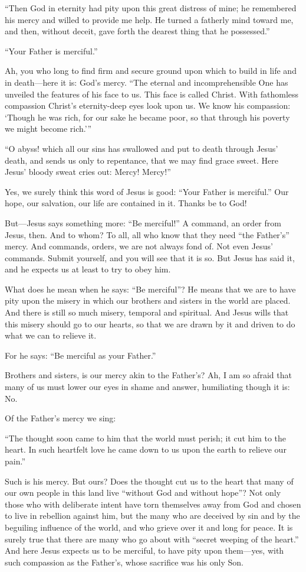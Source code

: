 “Then God in eternity had pity
upon this great distress of mine;
he remembered his mercy
and willed to provide me help.
He turned a fatherly mind toward me,
and then, without deceit, gave forth
the dearest thing that he possessed.”

“Your Father is merciful.”

Ah, you who long to find firm and secure ground upon which to build in life and in death—here it is: God’s mercy. “The eternal and incomprehensible One has unveiled the features of his face to us. This face is called Christ. With fathomless compassion Christ’s eternity-deep eyes look upon us. We know his compassion: ‘Though he was rich, for our sake he became poor, so that through his poverty we might become rich.’”

“O abyss! which all our sins
has swallowed and put to death through Jesus’ death,
and sends us only to repentance,
that we may find grace sweet.
Here Jesus’ bloody sweat cries out:
Mercy! Mercy!”

Yes, we surely think this word of Jesus is good: “Your Father is merciful.” Our hope, our salvation, our life are contained in it. Thanks be to God!

But—Jesus says something more: “Be merciful!” A command, an order from Jesus, then. And to whom? To all, all who know that they need “the Father’s” mercy. And commands, orders, we are not always fond of. Not even Jesus’ commands. Submit yourself, and you will see that it is so. But Jesus has said it, and he expects us at least to try to obey him.

What does he mean when he says: “Be merciful”? He means that we are to have pity upon the misery in which our brothers and sisters in the world are placed. And there is still so much misery, temporal and spiritual. And Jesus wills that this misery should go to our hearts, so that we are drawn by it and driven to do what we can to relieve it.

For he says: “Be merciful as your Father.”

Brothers and sisters, is our mercy akin to the Father’s? Ah, I am so afraid that many of us must lower our eyes in shame and answer, humiliating though it is: No.

Of the Father’s mercy we sing:

“The thought soon came to him
that the world must perish;
it cut him to the heart.
In such heartfelt love
he came down to us upon the earth
to relieve our pain.”

Such is his mercy. But ours? Does the thought cut us to the heart that many of our own people in this land live “without God and without hope”? Not only those who with deliberate intent have torn themselves away from God and chosen to live in rebellion against him, but the many who are deceived by sin and by the beguiling influence of the world, and who grieve over it and long for peace. It is surely true that there are many who go about with “secret weeping of the heart.” And here Jesus expects us to be merciful, to have pity upon them—yes, with such compassion as the Father’s, whose sacrifice was his only Son.

